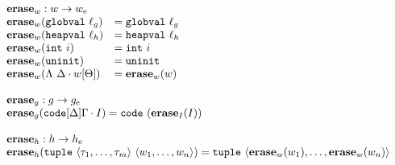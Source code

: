 {\footnotesize
\[\begin{array}{l}
\begin{array}{ll}
\rlap{$\erase_w : \high w -> \simple{w}$} \\
\erase_w(\mathtt{globval}\ \ell_g) &= \mathtt{globval}\ \ell_g \\
\erase_w(\mathtt{heapval}\ \ell_h) &= \mathtt{heapval}\ \ell_h \\
\erase_w(\mathtt{int}\ i) &= \mathtt{int}\ i \\
\erase_w(\mathtt{uninit}) &= \mathtt{uninit} \\
\erase_w(\Lambda\ \Delta \cdot \high w[\Theta]) &= \erase_w(\high w) \\
\end{array} \\\\

\begin{array}{l}
\rlap{$\erase_g : \high g -> \simple{g}$} \\
\erase_g(\mathtt{code}[\Delta]\Gamma \cdot I) = \mathtt{code}\ (\erase_I(I)) \\\\

\rlap{$\erase_h : \high h -> \simple{h}$} \\
\erase_h(\mathtt{tuple}\ \langle \tau_1, \dots, \tau_m \rangle\ \langle \high w_1, \dots, \high w_n \rangle) = \mathtt{tuple}\ \langle \erase_w(\high w_1), \dots, \erase_w(\high w_n) \rangle \\
\end{array} \\\\


\end{array}\]}
